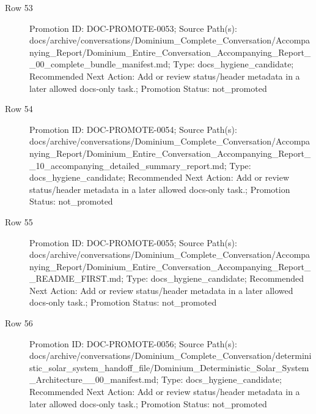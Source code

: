 \documentclass[9pt,a4paper,openany]{book}
\begin{document}
\begin{description}
\item[Row 53] Promotion ID: DOC-\allowbreak{}PROMOTE-\allowbreak{}0053; Source Path(s): docs/\allowbreak{}archive/\allowbreak{}conversations/\allowbreak{}Dominium\_\allowbreak{}Complete\_\allowbreak{}Conversation/\allowbreak{}Accompanying\_\allowbreak{}Report/\allowbreak{}Dominium\_\allowbreak{}Entire\_\allowbreak{}Conversation\_\allowbreak{}Accompanying\_\allowbreak{}Report\_\allowbreak{}\_\allowbreak{}00\_\allowbreak{}complete\_\allowbreak{}bundle\_\allowbreak{}manifest.\allowbreak{}md; Type: docs\_\allowbreak{}hygiene\_\allowbreak{}candidate; Recommended Next Action: Add or review status/\allowbreak{}header metadata in a later allowed docs-\allowbreak{}only task.\allowbreak{}; Promotion Status: not\_\allowbreak{}promoted
\item[Row 54] Promotion ID: DOC-\allowbreak{}PROMOTE-\allowbreak{}0054; Source Path(s): docs/\allowbreak{}archive/\allowbreak{}conversations/\allowbreak{}Dominium\_\allowbreak{}Complete\_\allowbreak{}Conversation/\allowbreak{}Accompanying\_\allowbreak{}Report/\allowbreak{}Dominium\_\allowbreak{}Entire\_\allowbreak{}Conversation\_\allowbreak{}Accompanying\_\allowbreak{}Report\_\allowbreak{}\_\allowbreak{}10\_\allowbreak{}accompanying\_\allowbreak{}detailed\_\allowbreak{}summary\_\allowbreak{}report.\allowbreak{}md; Type: docs\_\allowbreak{}hygiene\_\allowbreak{}candidate; Recommended Next Action: Add or review status/\allowbreak{}header metadata in a later allowed docs-\allowbreak{}only task.\allowbreak{}; Promotion Status: not\_\allowbreak{}promoted
\item[Row 55] Promotion ID: DOC-\allowbreak{}PROMOTE-\allowbreak{}0055; Source Path(s): docs/\allowbreak{}archive/\allowbreak{}conversations/\allowbreak{}Dominium\_\allowbreak{}Complete\_\allowbreak{}Conversation/\allowbreak{}Accompanying\_\allowbreak{}Report/\allowbreak{}Dominium\_\allowbreak{}Entire\_\allowbreak{}Conversation\_\allowbreak{}Accompanying\_\allowbreak{}Report\_\allowbreak{}\_\allowbreak{}README\_\allowbreak{}FIRST.\allowbreak{}md; Type: docs\_\allowbreak{}hygiene\_\allowbreak{}candidate; Recommended Next Action: Add or review status/\allowbreak{}header metadata in a later allowed docs-\allowbreak{}only task.\allowbreak{}; Promotion Status: not\_\allowbreak{}promoted
\item[Row 56] Promotion ID: DOC-\allowbreak{}PROMOTE-\allowbreak{}0056; Source Path(s): docs/\allowbreak{}archive/\allowbreak{}conversations/\allowbreak{}Dominium\_\allowbreak{}Complete\_\allowbreak{}Conversation/\allowbreak{}deterministic\_\allowbreak{}solar\_\allowbreak{}system\_\allowbreak{}handoff\_\allowbreak{}file/\allowbreak{}Dominium\_\allowbreak{}Deterministic\_\allowbreak{}Solar\_\allowbreak{}System\_\allowbreak{}Architecture\_\allowbreak{}\_\allowbreak{}00\_\allowbreak{}manifest.\allowbreak{}md; Type: docs\_\allowbreak{}hygiene\_\allowbreak{}candidate; Recommended Next Action: Add or review status/\allowbreak{}header metadata in a later allowed docs-\allowbreak{}only task.\allowbreak{}; Promotion Status: not\_\allowbreak{}promoted

\end{description}
\end{document}
